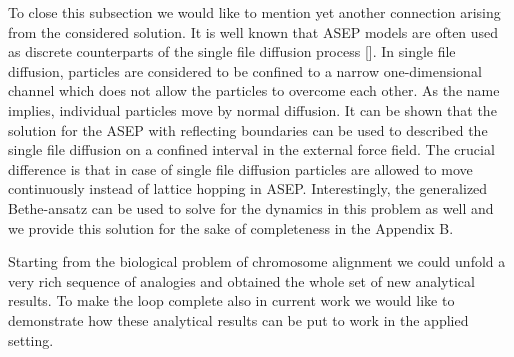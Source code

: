 \documentclass[aps,showpacs,twocolumn,floatfix,prx,superscriptaddress]{revtex4-1}
\begin{document}
%
%
%
%
%
%
%
To close this subsection we would like to mention yet another connection arising from the considered solution. It is well known that ASEP models are often used as discrete counterparts of the single file diffusion process []. In single file diffusion, particles are considered to be confined to a narrow one-dimensional channel which does not allow the particles to overcome each other. As the name implies, individual particles move by normal diffusion. It can be shown that the solution for the ASEP with reflecting boundaries can be used to described the single file diffusion on a confined interval in the external force field. The crucial difference is that in case of single file diffusion particles are allowed to move continuously instead of lattice hopping in ASEP. Interestingly, the generalized Bethe-ansatz can be used to solve for the dynamics in this problem as well and we provide this solution for the sake of completeness in the Appendix B. 

Starting from the biological problem of chromosome alignment we could unfold a very rich sequence of analogies and obtained the whole set of new analytical results. To make the loop complete also in current work we would like to demonstrate how these analytical results can be put to work in the applied setting.
\end{document}
